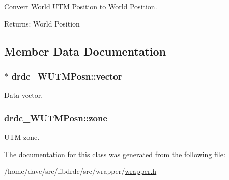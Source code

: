 Convert World UTM Position to World Position. 

\begin{Desc}
\item[Returns:]World Position \end{Desc}


\subsection{Member Data Documentation}
\hypertarget{classdrdc__WUTMPosn_5b083fd3680689ff552bdbff909f6a80}{
\subsubsection[vector]{$\ast$ {\bf drdc\_\-WUTMPosn::vector}}}
\label{classdrdc__WUTMPosn_5b083fd3680689ff552bdbff909f6a80}


Data vector. 

\hypertarget{classdrdc__WUTMPosn_c00550c816a3939d62df40940763beed}{
\subsubsection[zone]{ {\bf drdc\_\-WUTMPosn::zone}}}
\label{classdrdc__WUTMPosn_c00550c816a3939d62df40940763beed}


UTM zone. 



The documentation for this class was generated from the following file:\begin{CompactItemize}
\item 
/home/dave/src/libdrdc/src/wrapper/\hyperlink{wrapper_8h}{wrapper.h}\end{CompactItemize}
